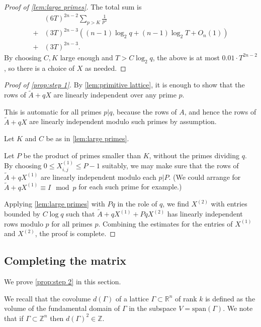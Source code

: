 \documentclass[12pt, a4paper]{amsart}
\numberwithin{equation}{section}
\theoremstyle{definition}
\newcommand{\R}{\mathbb{R}}
\newcommand{\Z}{\mathbb{Z}}
\newcommand{\spann}{\mathrm{span}}
\newcommand{\wt}{\widetilde}
\begin{document}
\begin{proof}[Proof of \cref{lem:large primes}]
The total sum is 
\begin{align*}
 & (6T)^{2n-2}\sum_{p>K}\frac{1}{p^{2}}\\
+ & (3T)^{2n-3}\left((n-1)\log_2 q+(n-1)\log_2 T+O_{n}(1)\right)\\
+ & (3T)^{2n-3}.
\end{align*}
By choosing $C,K$ large enough and $T>C\log_2 q$, the above is at most $0.01\cdot T^{2n-2}$, so there is a choice of $X$ as needed.
\end{proof}






\begin{proof}[Proof of \cref{prop:step 1}]
By \cref{lem:primitive lattice}, it is enough to show that the rows
of $\wt A+qX$ are linearly independent over any prime $p$. 

This is automatic for all primes $p|q$, because the rows of $A$, and hence the rows
of $\wt A+qX$ are linearly independent modulo such primes by assumption.

Let $K$ and $C$ be as in \cref{lem:large primes}. 

Let $P$ be the product of primes smaller than $K$, without the primes
dividing $q$. By choosing $0\le X_{i,j}^{(1)}\le P-1$ suitably, we may make sure
that the rows of $\wt A+qX^{(1)}$ are linearly independent modulo each $p|P$.
(We could arrange for $\wt A+qX^{(1)}\equiv I\mod p$ for each such prime for example.)

Applying \cref{lem:large primes} with $Pq$ in the role of $q$, we find $X^{(2)}$ with entries bounded by $C\log q$
such that $\wt A+qX^{(1)}+Pq X^{(2)}$ has linearly independent rows modulo $p$
for all primes $p$.
Combining the estimates for the entries of $X^{(1)}$ and $X^{(2)}$, the proof is
complete.
\end{proof}


\subsection{Completing the matrix}\label{sec:second step}

We prove \cref{prop:step 2} in this section.

We recall that the covolume $d(\Gamma)$ of a lattice $\Gamma \subset \R^n$ of rank $k$ is
defined as the volume of the fundamental domain of $\Gamma$ in the subspace $V= \spann (\Gamma)$.
We note that if $\Gamma \subset \Z^n$ then $d(\Gamma)^2 \in \Z$.
\end{document}
